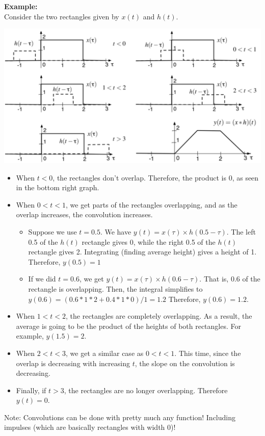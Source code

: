 \documentclass[10pt]{article}
\newcommand{\example}{\textbf{Example: }}
\begin{document}
\example\\
Consider the two rectangles given by $x(t)$ and $h(t)$.
\begin{center}
    \includegraphics[scale=0.6]{W3_8.png}
\end{center}
\begin{itemize}
    \item When $t < 0$, the rectangles don't overlap.  Therefore, the product is 0, as seen in the bottom right graph.
    \item When $0 < t < 1$, we get parts of the rectangles overlapping, and as the overlap increases, the convolution increases.
    \begin{itemize}
        \item Suppose we use $t = 0.5$.  We have $y(t) = x(\tau) \times h(0.5 - \tau)$.  The left 0.5 of the $h(t)$ rectangle gives 0, while the right 0.5 of the $h(t)$ rectangle gives 2.  Integrating (finding average height) gives a height of 1.  Therefore, $y(0.5) = 1$ 
        \item If we did $t = 0.6$, we get $y(t) = x(\tau) \times h(0.6 - \tau)$.  That is, 0.6 of the rectangle is overlapping.  Then, the integral simplifies to $y(0.6) = (0.6 * 1 * 2 + 0.4 * 1 * 0) / 1 = 1.2$  Therefore, $y(0.6) = 1.2$.
    \end{itemize}
    \item When $1 < t < 2$, the rectangles are completely overlapping.  As a result, the average is going to be the product of the heights of both rectangles.  For example, $y(1.5) = 2$.
    \item When $2 < t < 3$, we get a similar case as $0 < t < 1$.  This time, since the overlap is decreasing with increasing $t$, the slope on the convolution is decreasing.
    \item Finally, if $t > 3$, the rectangles are no longer overlapping.  Therefore $y(t) = 0$.
\end{itemize}
Note: Convolutions can be done with pretty much any function!  Including impulses (which are basically rectangles with width 0)!
\end{document}
